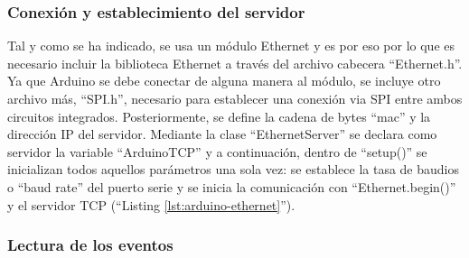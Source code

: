 \subsubsection{Conexión y establecimiento del servidor}\label{s3_5_2_1}

Tal y como se ha indicado, se usa un módulo Ethernet y es por eso por lo que es necesario incluir la biblioteca Ethernet a través del archivo cabecera ``Ethernet.h''. Ya que Arduino se debe conectar de alguna manera al módulo, se incluye otro archivo más, ``SPI.h'', necesario para establecer una conexión via SPI entre ambos circuitos integrados. Posteriormente, se define la cadena de bytes ``mac'' y la dirección IP del servidor. Mediante la clase ``EthernetServer'' se declara como servidor la variable ``ArduinoTCP'' y a continuación, dentro de ``setup()'' se inicializan todos aquellos parámetros una sola vez: se establece la tasa de baudios o ``baud rate'' del puerto serie y se inicia la comunicación con ``Ethernet.begin()'' y el servidor TCP (``Listing \ref{lst:arduino-ethernet}'').



\subsubsection{Lectura de los eventos}\label{s3_5_2_2}

